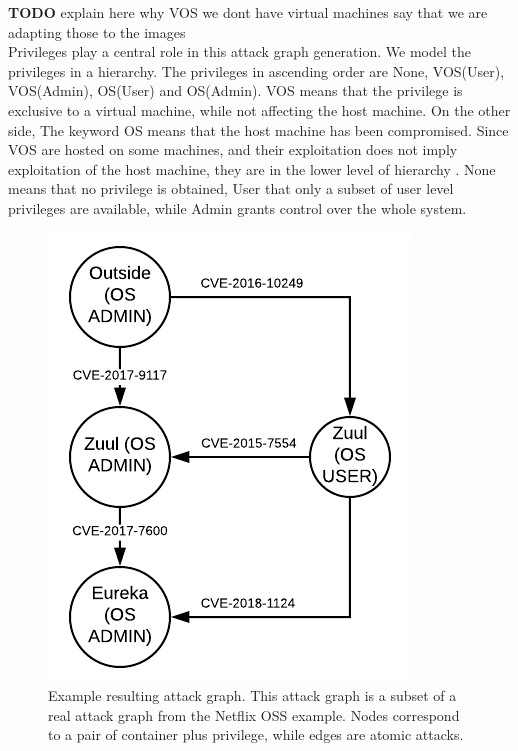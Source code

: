 \textbf{TODO} explain here why VOS we dont have virtual machines say that we are adapting those to the images\\
Privileges play a central role in this attack graph generation. We model the privileges in a hierarchy. The privileges in ascending order are None, VOS(User), VOS(Admin), OS(User) and OS(Admin). VOS means that the privilege is exclusive to a virtual machine, while not affecting the host machine. On the other side, The keyword OS means that the host machine has been compromised. Since VOS are hosted on some machines, and their exploitation does not imply exploitation of the host machine, they are in the lower level of hierarchy \cite{aksu2018automated}. None means that no privilege is obtained, User that only a subset of user level privileges are available, while Admin grants control over the whole system.



\begin{figure}
	\includegraphics[]{./images/Attack_graph}
	\caption{Example resulting attack graph. This attack graph is a subset of a real attack graph from the Netflix OSS example. Nodes correspond to a pair of container plus privilege, while edges are atomic attacks.}
	\label{AttackGraph}
\end{figure}

